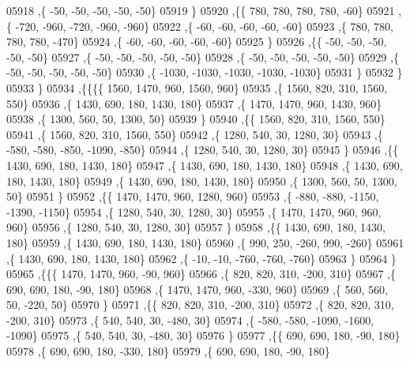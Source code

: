 \begin{DoxyCode}
05918     ,\{   -50,   -50,   -50,   -50,   -50\}
05919     \}
05920    ,\{\{   780,   780,   780,   780,   -60\}
05921     ,\{  -720,  -960,  -720,  -960,  -960\}
05922     ,\{   -60,   -60,   -60,   -60,   -60\}
05923     ,\{   780,   780,   780,   780,  -470\}
05924     ,\{   -60,   -60,   -60,   -60,   -60\}
05925     \}
05926    ,\{\{   -50,   -50,   -50,   -50,   -50\}
05927     ,\{   -50,   -50,   -50,   -50,   -50\}
05928     ,\{   -50,   -50,   -50,   -50,   -50\}
05929     ,\{   -50,   -50,   -50,   -50,   -50\}
05930     ,\{ -1030, -1030, -1030, -1030, -1030\}
05931     \}
05932    \}
05933   \}
05934  ,\{\{\{\{  1560,  1470,   960,  1560,   960\}
05935     ,\{  1560,   820,   310,  1560,   550\}
05936     ,\{  1430,   690,   180,  1430,   180\}
05937     ,\{  1470,  1470,   960,  1430,   960\}
05938     ,\{  1300,   560,    50,  1300,    50\}
05939     \}
05940    ,\{\{  1560,   820,   310,  1560,   550\}
05941     ,\{  1560,   820,   310,  1560,   550\}
05942     ,\{  1280,   540,    30,  1280,    30\}
05943     ,\{  -580,  -580,  -850, -1090,  -850\}
05944     ,\{  1280,   540,    30,  1280,    30\}
05945     \}
05946    ,\{\{  1430,   690,   180,  1430,   180\}
05947     ,\{  1430,   690,   180,  1430,   180\}
05948     ,\{  1430,   690,   180,  1430,   180\}
05949     ,\{  1430,   690,   180,  1430,   180\}
05950     ,\{  1300,   560,    50,  1300,    50\}
05951     \}
05952    ,\{\{  1470,  1470,   960,  1280,   960\}
05953     ,\{  -880,  -880, -1150, -1390, -1150\}
05954     ,\{  1280,   540,    30,  1280,    30\}
05955     ,\{  1470,  1470,   960,   960,   960\}
05956     ,\{  1280,   540,    30,  1280,    30\}
05957     \}
05958    ,\{\{  1430,   690,   180,  1430,   180\}
05959     ,\{  1430,   690,   180,  1430,   180\}
05960     ,\{   990,   250,  -260,   990,  -260\}
05961     ,\{  1430,   690,   180,  1430,   180\}
05962     ,\{   -10,   -10,  -760,  -760,  -760\}
05963     \}
05964    \}
05965   ,\{\{\{  1470,  1470,   960,   -90,   960\}
05966     ,\{   820,   820,   310,  -200,   310\}
05967     ,\{   690,   690,   180,   -90,   180\}
05968     ,\{  1470,  1470,   960,  -330,   960\}
05969     ,\{   560,   560,    50,  -220,    50\}
05970     \}
05971    ,\{\{   820,   820,   310,  -200,   310\}
05972     ,\{   820,   820,   310,  -200,   310\}
05973     ,\{   540,   540,    30,  -480,    30\}
05974     ,\{  -580,  -580, -1090, -1600, -1090\}
05975     ,\{   540,   540,    30,  -480,    30\}
05976     \}
05977    ,\{\{   690,   690,   180,   -90,   180\}
05978     ,\{   690,   690,   180,  -330,   180\}
05979     ,\{   690,   690,   180,   -90,   180\}

\end{DoxyCode}
